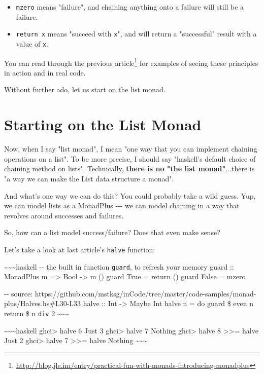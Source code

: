 \documentclass[]{article}
\renewcommand{\href}[2]{#2\footnote{\url{#1}}}
\begin{document}
\begin{itemize}
\tightlist
\item
  \texttt{mzero} means "failure", and chaining anything onto a failure will
  still be a failure.
\item
  \texttt{return\ x} means "succeed with \texttt{x}", and will return a
  "successful" result with a value of \texttt{x}.
\end{itemize}

You can read through the
\href{http://blog.jle.im/entry/practical-fun-with-monads-introducing-monadplus}{previous
article} for examples of seeing these principles in action and in real code.

Without further ado, let us start on the list monad.

\section{Starting on the List Monad}

Now, when I say "list monad", I mean "one way that you can implement chaining
operations on a list". To be more precise, I should say "haskell's default
choice of chaining method on lists". Technically, \textbf{there is no "the list
monad"}...there is "a way we can make the List data structure a monad".

And what's one way we can do this? You could probably take a wild guess. Yup, we
can model lists as a MonadPlus -\/-\/- we can model chaining in a way that
revolves around successes and failures.

So, how can a list model success/failure? Does that even make sense?

Let's take a look at last article's \texttt{halve} function:

\textasciitilde{}\textasciitilde{}\textasciitilde{}haskell -\/- the built in
function \texttt{guard}, to refresh your memory guard :: MonadPlus m
=\textgreater{} Bool -\textgreater{} m () guard True = return () guard False =
mzero

-\/- source:
https://github.com/mstksg/inCode/tree/master/code-samples/monad-plus/Halves.hs\#L30-L33
halve :: Int -\textgreater{} Maybe Int halve n = do guard \$ even n return \$ n
\texttt{div} 2 \textasciitilde{}\textasciitilde{}\textasciitilde{}

\textasciitilde{}\textasciitilde{}\textasciitilde{}haskell ghci\textgreater{}
halve 6 Just 3 ghci\textgreater{} halve 7 Nothing ghci\textgreater{} halve 8
\textgreater{}\textgreater{}= halve Just 2 ghci\textgreater{} halve 7
\textgreater{}\textgreater{}= halve Nothing
\textasciitilde{}\textasciitilde{}\textasciitilde{}
\end{document}

